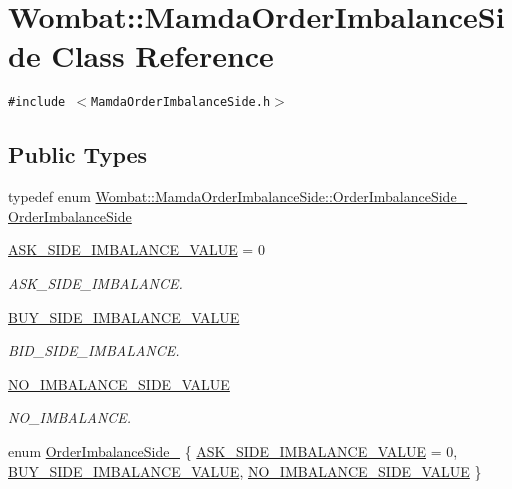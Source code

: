 \hypertarget{classWombat_1_1MamdaOrderImbalanceSide}{
\section{Wombat::Mamda\-Order\-Imbalance\-Side Class Reference}
\label{classWombat_1_1MamdaOrderImbalanceSide}
}
{\tt \#include $<$Mamda\-Order\-Imbalance\-Side.h$>$}

\subsection*{Public Types}
\begin{CompactItemize}
\item 
typedef enum \hyperlink{classWombat_1_1MamdaOrderImbalanceSide_dc7dcca85ab876bdefbcbb584ca38860}{Wombat::Mamda\-Order\-Imbalance\-Side::Order\-Imbalance\-Side\_\-} \hyperlink{classWombat_1_1MamdaOrderImbalanceSide_835b164f1c50ae9416b3567deb24d5c2}{Order\-Imbalance\-Side}
\item 
\hyperlink{classWombat_1_1MamdaOrderImbalanceSide_dc7dcca85ab876bdefbcbb584ca388605484bebbea9ddeb135c3c13188923751}{ASK\_\-SIDE\_\-IMBALANCE\_\-VALUE} = 0
\begin{CompactList}\small\item\em ASK\_\-SIDE\_\-IMBALANCE. \item\end{CompactList}\item 
\hyperlink{classWombat_1_1MamdaOrderImbalanceSide_dc7dcca85ab876bdefbcbb584ca38860238757788afb7c14e7ede1580bacb5e9}{BUY\_\-SIDE\_\-IMBALANCE\_\-VALUE}
\begin{CompactList}\small\item\em BID\_\-SIDE\_\-IMBALANCE. \item\end{CompactList}\item 
\hyperlink{classWombat_1_1MamdaOrderImbalanceSide_dc7dcca85ab876bdefbcbb584ca3886037135a61dc5503d6ed6e74c2f8f3bcea}{NO\_\-IMBALANCE\_\-SIDE\_\-VALUE}
\begin{CompactList}\small\item\em NO\_\-IMBALANCE. \item\end{CompactList}\item 
enum \hyperlink{classWombat_1_1MamdaOrderImbalanceSide_dc7dcca85ab876bdefbcbb584ca38860}{Order\-Imbalance\-Side\_\-} \{ \hyperlink{classWombat_1_1MamdaOrderImbalanceSide_dc7dcca85ab876bdefbcbb584ca388605484bebbea9ddeb135c3c13188923751}{ASK\_\-SIDE\_\-IMBALANCE\_\-VALUE} =  0, 
\hyperlink{classWombat_1_1MamdaOrderImbalanceSide_dc7dcca85ab876bdefbcbb584ca38860238757788afb7c14e7ede1580bacb5e9}{BUY\_\-SIDE\_\-IMBALANCE\_\-VALUE}, 
\hyperlink{classWombat_1_1MamdaOrderImbalanceSide_dc7dcca85ab876bdefbcbb584ca3886037135a61dc5503d6ed6e74c2f8f3bcea}{NO\_\-IMBALANCE\_\-SIDE\_\-VALUE}
 \}
\end{CompactItemize}
